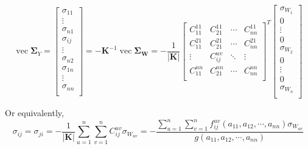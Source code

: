 \documentclass{article}
\begin{document}
\begin{equation}
\operatorname{vec} \mathbf{\Sigma}_Y=
\left[ \begin{array}{c}
\sigma_{11} \\
\vdots \\
\sigma_{n1} \\
\sigma_{ij} \\
\vdots \\
\sigma_{n2} \\
\sigma_{1n} \\
\vdots \\
\sigma_{nn} \\
\end{array} \right]=
-\mathbf{K}^{-1} \operatorname{vec} \mathbf{\Sigma_W} =- \frac{1}{|\mathbf{K}|}
\left[ \begin{array}{cccc}
C_{11}^{11} & C_{21}^{11} & \cdots & C_{nn}^{11} \\
C_{11}^{21} & C_{21}^{21} & \cdots & C_{nn}^{21} \\
\vdots & C_{ij}^{uv} & \ddots & \vdots \\
C_{11}^{nn} & C_{21}^{nn} & \cdots & C_{nn}^{nn} \\
\end{array} \right]^T
\left[ \begin{array}{c}
\sigma_{W_1} \\
0 \\
\vdots \\
0 \\
\sigma_{W_2} \\
0 \\
\vdots \\
0 \\
\sigma_{W_n} \\
\end{array} \right]
\end{equation}


Or equivalently,
\begin{equation}
\sigma_{ij}=\sigma_{ji}=- \frac{1}{|\mathbf{K}|}
\sum_{u=1}^{n} \sum_{v=1}^{n} C_{ij}^{uv} \sigma_{W_{uv}}=
- \frac{\sum_{u=1}^{n} \sum_{v=1}^{n}
f_{ij}^{uv}(a_{11},a_{12},\cdots, a_{nn}) \sigma_{W_{uv}}}{g(a_{11},a_{12},\cdots, a_{nn})}
\label{eq:sigma_ij_final}
\end{equation}
\end{document}
